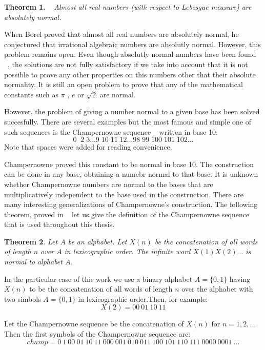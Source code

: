 \documentclass[11pt,a4paper]{tesis}
\newtheorem{theorem}{Theorem}[section]
\theoremstyle{definition}
\begin{document}
\begin{theorem} ~\cite{Borel}
    Almost all real numbers (with respect to Lebesgue measure) are absolutely normal.
\end{theorem}

When Borel proved that almost all real numbers are absolutely normal, he conjectured that irrational algebraic numbers are absolutly normal. However, this problem remains open.
Even though absolutly normal numbers have been found ~\cite{Sierpinski}, the solutions are not fully satisfactory if we take into account that it is not possible to prove any other properties on this numbers other that their absolute normality.
It is still an open problem to prove that any of the mathematical constants such as $\pi$ , $e$ or $\sqrt{2}$ are normal.

However, the problem of giving a number normal to a given base has been solved succesfully. There are several examples but the most famous and simple one of such sequences is the Champernowne sequence ~\cite{champern} written in base 10:
$$0 \; \;2 \;3 \dots 9 \; 10 \; 11 \; 12 \dots 98 \; 99 \; 100 \; 101 \; 102 \dots$$ 
Note that spaces were added for reading convenience.


Champernowne proved this constant to be normal in base 10. The construction can be done in any base, obtaining a numebr normal to that base. It is unknown whether Champernowne numbers are normal to
the bases that are multiplicatively independent to the base used in the construction. There are many interesting generalizations of Champernowne's construction. The following theorem, proved in ~\cite{BC2018} let us give the definition of the Champernowne sequence that is used throughout this thesis.
\\

\begin{theorem}
    Let $A$ be an alphabet. Let $X(n)$ be the concatenation of all words of length $n$ over $A$ in lexicographic order.
     The infinite word $X(1)X(2)\dots$ is normal to alphabet $A$.
\end{theorem}

In the particular case of this work we use a binary alphabet  $A=\{0,1\}$ having $X(n)$ to be the concatenation of all words of length $n$ over the alphabet with two simbols $A=\{0,1\}$ in lexicographic order.Then, for example:
$$X(2) = 00 \: 01 \: 10 \: 11$$

Let the Champernowne sequence be the concatenation of $X(n)$ for $n = 1,2,\dots$ Then the first symbols of the Champernowne sequence are:
$$champ = 0 \: 1 \: 00 \: 01 \: 10 \: 11 \: 000 \: 001 \: 010 \: 011 \: 100 \: 101 \: 110 \: 111 \: 0000 \: 0001 \: \dots$$
\end{document}
